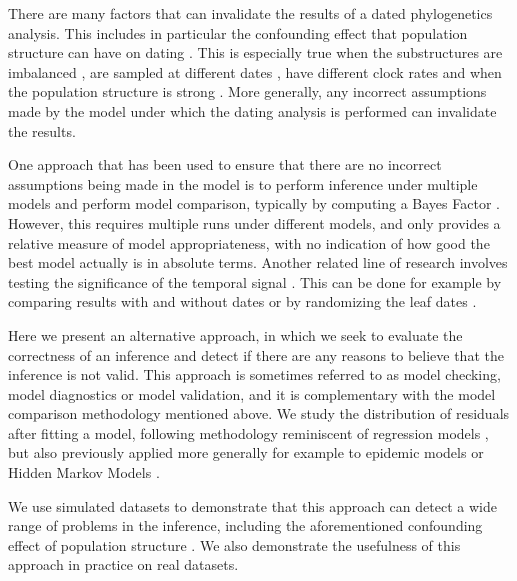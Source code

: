 \documentclass{article}
\begin{document}
There are many factors that can invalidate the results of a dated phylogenetics analysis.
This includes in particular the confounding effect that population structure can have on dating 
\citep{Duchene2015a,Murray2016}. This is especially true when the substructures are 
imbalanced \citep{ducheneTreeImbalanceCauses2015}, are sampled
at different dates \citep{tongComparisonMethodsEstimating2018}, have different clock rates
\citep{wertheimInconsistenciesEstimatingAge2012}  and when the population structure is strong 
\citep{navascuesElevatedSubstitutionRate2009}. 
More generally, any incorrect assumptions made by the model under which the dating analysis is performed
can invalidate the results.

One approach that has been used to ensure that there are no incorrect assumptions being made in the 
model is to perform inference under multiple models and perform model comparison,
typically by computing a Bayes Factor \citep{Baele2012,Li2012,bouckaertBModelTestBayesianPhylogenetic2017}. 
However, this requires multiple runs under different models, and only provides a relative measure
of model appropriateness, with no indication of how good the best model actually is in absolute terms.
Another related line of research involves testing the significance of the temporal signal 
\citep{Duchene2015a,Duchene2020}. This can be done for example by 
comparing results with and without dates \citep{Rambaut2000} or by 
randomizing the leaf dates \citep{Duchene2015a}. 

Here we present an alternative approach, in which we seek to evaluate
the correctness of an inference and detect if there are any reasons to believe that the inference is not valid.
This approach is sometimes referred to as model checking, model diagnostics or model validation, 
and it is complementary with the model comparison methodology mentioned above. 
We study the distribution of residuals after fitting a model, following methodology
reminiscent of regression models
\citep{coxGeneralDefinitionResiduals1968,dunnRandomizedQuantileResiduals1996},
but also previously applied more generally for example to
epidemic models \citep{lauNewModelDiagnostics2014} or 
 Hidden Markov Models \citep{zucchini2009hidden,buckbyModelCheckingHidden2020}.

We use simulated datasets to demonstrate that this approach can detect a wide range of problems
in the inference, including the aforementioned confounding effect of population structure
\citep{Murray2016}. 
We also demonstrate the usefulness of this approach in practice on real datasets.
\end{document}
